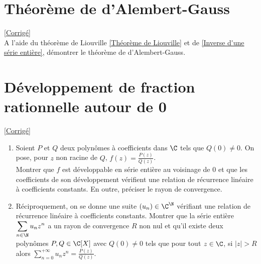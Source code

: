 \documentclass{book}
\begin{document}
\section{Théorème de d'Alembert-Gauss}
\label{Théorème de d'Alembert-Gauss}
\textcolor{blue}{\hyperref[sec:theoreme-de-dalembert-gauss]{[Corrigé]}}\\
A l'aide du théorème de Liouville \ref{Théorème de Liouville} et de \ref{Inverse d'une série entière}, démontrer le théorème de d'Alembert-Gauss.

\section{Développement de fraction rationnelle autour de 0}
\label{Développement de fraction rationnelle autour de 0}
\textcolor{blue}{\hyperref[sec:developpement-de-fraction-rationnelle-autour-de-0]{[Corrigé]}}\\
\begin{enumerate}[leftmargin=*]
	\item Soient $P$ et $Q$ deux polynômes à coefficients dans $\C$ tels que $Q(0)\ne 0$. On pose, pour $z$ non racine de $Q$, $f(z)=\displaystyle\frac{P(z)}{Q(z)}$.\\
	Montrer que $f$ est développable en série entière au voisinage de $0$ et que les coefficients de son développement vérifient une relation de récurrence linéaire à coefficients constants. En outre, préciser le rayon de convergence.
	\item Réciproquement, on se donne une suite $(u_n)\in \C^\N$ vérifiant une relation de récurrence linéaire à coefficients constants. Montrer que la série entière $\displaystyle\sum_{n\in \N}u_nz^n$ a un rayon de convergence $R$ non nul et qu'il existe deux polynômes $P,Q\in \C[X]$ avec $Q(0)\ne 0$ tels que pour tout $z\in \C$, si $|z|>R$ alors $\displaystyle\sum_{n=0}^{+\infty}u_nz^n=\frac{P(z)}{Q(z)}$.
\end{enumerate}
\end{document}
